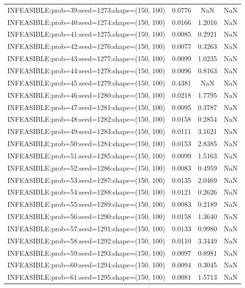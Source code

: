 \begin{longtable}{lccc}
INFEASIBLE:prob=39:seed=1273:shape=(150, 100)  & 0.0776 &     NaN &    NaN \\
INFEASIBLE:prob=40:seed=1274:shape=(150, 100)  & 0.0166 &  1.2016 &    NaN \\
INFEASIBLE:prob=41:seed=1275:shape=(150, 100)  & 0.0085 &  0.2921 &    NaN \\
INFEASIBLE:prob=42:seed=1276:shape=(150, 100)  & 0.0077 &  0.3263 &    NaN \\
INFEASIBLE:prob=43:seed=1277:shape=(150, 100)  & 0.0099 &  1.0235 &    NaN \\
INFEASIBLE:prob=44:seed=1278:shape=(150, 100)  & 0.0096 &  0.8163 &    NaN \\
INFEASIBLE:prob=45:seed=1279:shape=(150, 100)  & 0.4381 &     NaN &    NaN \\
INFEASIBLE:prob=46:seed=1280:shape=(150, 100)  & 0.0218 &  1.7795 &    NaN \\
INFEASIBLE:prob=47:seed=1281:shape=(150, 100)  & 0.0095 &  0.3787 &    NaN \\
INFEASIBLE:prob=48:seed=1282:shape=(150, 100)  & 0.0158 &  0.2854 &    NaN \\
INFEASIBLE:prob=49:seed=1283:shape=(150, 100)  & 0.0111 &  3.1621 &    NaN \\
INFEASIBLE:prob=50:seed=1284:shape=(150, 100)  & 0.0153 &  2.8385 &    NaN \\
INFEASIBLE:prob=51:seed=1285:shape=(150, 100)  & 0.0099 &  1.5163 &    NaN \\
INFEASIBLE:prob=52:seed=1286:shape=(150, 100)  & 0.0083 &  0.4959 &    NaN \\
INFEASIBLE:prob=53:seed=1287:shape=(150, 100)  & 0.0135 &  2.0469 &    NaN \\
INFEASIBLE:prob=54:seed=1288:shape=(150, 100)  & 0.0121 &  0.2626 &    NaN \\
INFEASIBLE:prob=55:seed=1289:shape=(150, 100)  & 0.0083 &  0.2189 &    NaN \\
INFEASIBLE:prob=56:seed=1290:shape=(150, 100)  & 0.0158 &  1.3640 &    NaN \\
INFEASIBLE:prob=57:seed=1291:shape=(150, 100)  & 0.0133 &  0.9980 &    NaN \\
INFEASIBLE:prob=58:seed=1292:shape=(150, 100)  & 0.0110 &  3.3449 &    NaN \\
INFEASIBLE:prob=59:seed=1293:shape=(150, 100)  & 0.0097 &  0.8981 &    NaN \\
INFEASIBLE:prob=60:seed=1294:shape=(150, 100)  & 0.0094 &  0.3045 &    NaN \\
INFEASIBLE:prob=61:seed=1295:shape=(150, 100)  & 0.0081 &  1.5713 &    NaN \\

\end{longtable}
